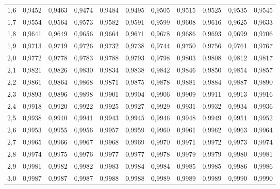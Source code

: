 \documentclass[12pt,a4paper]{article}
\begin{document}
\begin{center}
\begin{tabular}{c*{10}{c}}
1,6 & 0,9452 & 0,9463 & 0,9474 & 0,9484 & 0,9495 & 0,9505 & 0,9515 & 0,9525 & 0,9535 & 0,9545 \\
1,7 & 0,9554 & 0,9564 & 0,9573 & 0,9582 & 0,9591 & 0,9599 & 0,9608 & 0,9616 & 0,9625 & 0,9633 \\
1,8 & 0,9641 & 0,9649 & 0,9656 & 0,9664 & 0,9671 & 0,9678 & 0,9686 & 0,9693 & 0,9699 & 0,9706 \\
1,9 & 0,9713 & 0,9719 & 0,9726 & 0,9732 & 0,9738 & 0,9744 & 0,9750 & 0,9756 & 0,9761 & 0,9767 \\
2,0 & 0,9772 & 0,9778 & 0,9783 & 0,9788 & 0,9793 & 0,9798 & 0,9803 & 0,9808 & 0,9812 & 0,9817 \\
2,1 & 0,9821 & 0,9826 & 0,9830 & 0,9834 & 0,9838 & 0,9842 & 0,9846 & 0,9850 & 0,9854 & 0,9857 \\
2,2 & 0,9861 & 0,9864 & 0,9868 & 0,9871 & 0,9875 & 0,9878 & 0,9881 & 0,9884 & 0,9887 & 0,9890 \\
2,3 & 0,9893 & 0,9896 & 0,9898 & 0,9901 & 0,9904 & 0,9906 & 0,9909 & 0,9911 & 0,9913 & 0,9916 \\
2,4 & 0,9918 & 0,9920 & 0,9922 & 0,9925 & 0,9927 & 0,9929 & 0,9931 & 0,9932 & 0,9934 & 0,9936 \\
2,5 & 0,9938 & 0,9940 & 0,9941 & 0,9943 & 0,9945 & 0,9946 & 0,9948 & 0,9949 & 0,9951 & 0,9952 \\
2,6 & 0,9953 & 0,9955 & 0,9956 & 0,9957 & 0,9959 & 0,9960 & 0,9961 & 0,9962 & 0,9963 & 0,9964 \\
2,7 & 0,9965 & 0,9966 & 0,9967 & 0,9968 & 0,9969 & 0,9970 & 0,9971 & 0,9972 & 0,9973 & 0,9974 \\
2,8 & 0,9974 & 0,9975 & 0,9976 & 0,9977 & 0,9977 & 0,9978 & 0,9979 & 0,9979 & 0,9980 & 0,9981 \\
2,9 & 0,9981 & 0,9982 & 0,9982 & 0,9983 & 0,9984 & 0,9984 & 0,9985 & 0,9985 & 0,9986 & 0,9986 \\
3,0 & 0,9987 & 0,9987 & 0,9987 & 0,9988 & 0,9988 & 0,9989 & 0,9989 & 0,9989 & 0,9990 & 0,9990 \\
\bottomrule
\end{tabular}
\end{center}
\end{document}

